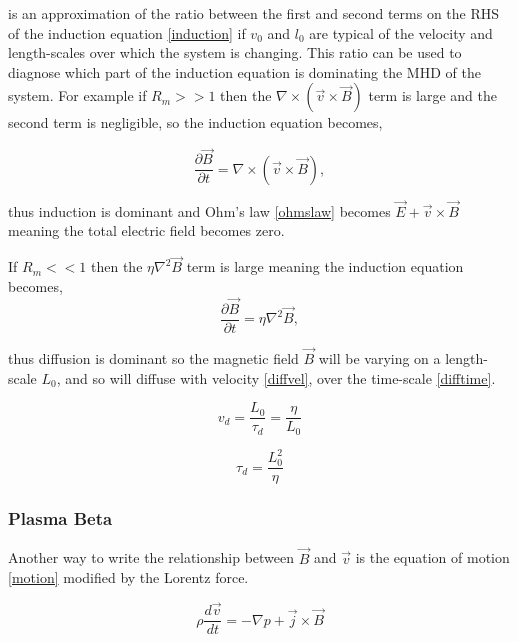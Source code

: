 is an approximation of the ratio between the first and second terms on the RHS of the induction equation \ref{induction} if $v_0$ and $l_0$ are typical of the velocity and length-scales over which the system is changing. This ratio can be used to diagnose which part of the induction equation is dominating the MHD of the system. For example if $R_m >> 1$ then the $\nabla\times(\vec{v}\times\vec{B})$ term is large and the second term is negligible, so the induction equation becomes,

\begin{equation}\label{r>>1}
\frac{\partial \vec{B}}{\partial t}=\nabla\times(\vec{v}\times\vec{B}),
\end{equation}

thus induction is dominant and Ohm's law \ref{ohmslaw} becomes $\vec{E} +\vec{v}\times\vec{B}$ meaning the total electric field becomes zero.



If $R_m << 1$ then the $\eta\nabla^{2}\vec{B}$ term is large meaning the induction equation becomes,
\begin{equation}\label{r<<1}
\frac{\partial \vec{B}}{\partial t}=\eta\nabla^{2}\vec{B},
\end{equation}

thus diffusion is dominant so the magnetic field $\vec{B}$ will be varying on a length-scale $L_0$, and so will diffuse with velocity \ref{diffvel}, over the time-scale \ref{difftime}.

\begin{equation}\label{diffvel}
v_d=\frac{L_0}{\tau_d} = \frac{\eta}{L_0}
\end{equation}


\begin{equation}\label{difftime}
\tau_d = \frac{L_{0}^{2}}{\eta}
\end{equation}

\citep{2003dysu.book.....D}

%
\subsubsection{Plasma Beta}
Another way to write the relationship between $\vec{B}$ and $\vec{v}$ is the equation of motion \ref{motion} modified by the Lorentz force.

\begin{equation}\label{motion1}
\rho\frac{d\vec{v}}{dt}=-\nabla p+\vec{j}\times\vec{B}
\end{equation}

